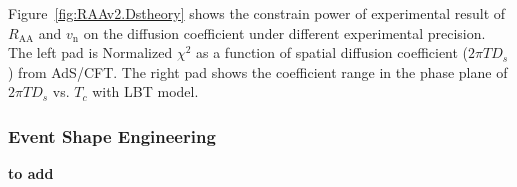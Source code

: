 Figure~\ref{fig:RAAv2.Dstheory} shows the constrain power of experimental result of $R_{\mathrm{AA}}$ and $v_{\mathrm{n}}$ on the diffusion coefficient under different experimental precision. The left pad is Normalized $\chi^{2}$ as a function of spatial diffusion coefficient ($2\pi TD_{s}$) from AdS/CFT. The right pad shows the coefficient range in the phase plane of $2\pi TD_{s}$ vs. $T_{c}$ with LBT model.

\subsubsection{Event Shape Engineering}
\textbf{to add}
